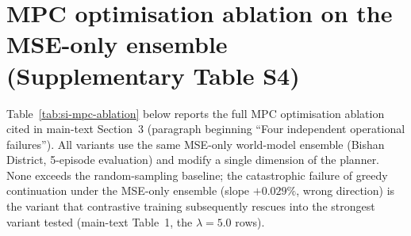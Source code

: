 \documentclass[11pt]{article}
\begin{document}
\section{MPC optimisation ablation on the MSE-only ensemble (Supplementary Table S4)}\label{si:s2-mpc-ablation}

Table~\ref{tab:si-mpc-ablation} below reports the full MPC optimisation ablation cited in main-text Section~3 (paragraph beginning ``Four independent operational failures''). All variants use the same MSE-only world-model ensemble (Bishan District, 5-episode evaluation) and modify a single dimension of the planner. None exceeds the random-sampling baseline; the catastrophic failure of greedy continuation under the MSE-only ensemble (slope $+0.029\%$, wrong direction) is the variant that contrastive training subsequently rescues into the strongest variant tested (main-text Table~1, the $\lambda{=}5.0$ rows).

\begin{table}[htbp]
\centering
\small
\caption{MPC optimisation ablation across four dimensions, on the MSE-only world-model ensemble (Bishan District). All variants start from the optimal $H{=}5$, $K{=}50$ random-reward configuration and modify one dimension. None exceeds the random-sampling baseline; aggressive exploitation (greedy continuation) actively reverses the slope direction. The diagnostic shows that the failure is structural to the learned model rather than to the search procedure.}
\label{tab:si-mpc-ablation}
\end{table}
\end{document}
